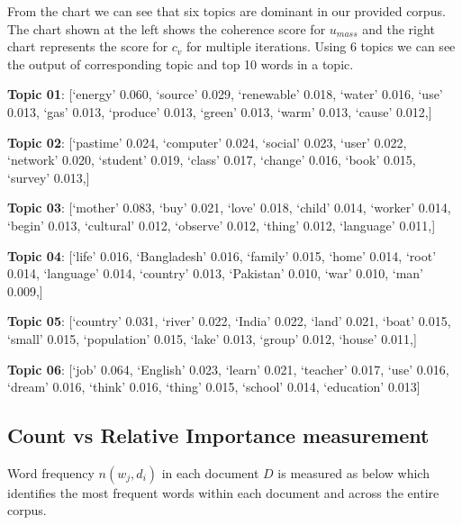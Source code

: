 \documentclass[sn-mathphys,Numbered]{sn-jnl}%
\theoremstyle{thmstyleone}%
\theoremstyle{thmstyletwo}%
\theoremstyle{thmstylethree}%
\begin{document}
From the chart we can see that six topics are dominant in our provided
corpus. The chart shown at the left shows the coherence score for
\(u_{mass}\) and the right chart represents the score for \(c_{v}\) for
multiple iterations. Using 6 topics we can see the output of
corresponding topic and top 10 words in a topic.



\textbf{Topic 01}: {[}\enquote*{energy} 0.060, \enquote*{source} 0.029, \enquote*{renewable} 0.018, \enquote*{water}
0.016, \enquote*{use} 0.013, \enquote*{gas} 0.013, \enquote*{produce} 0.013, \enquote*{green} 0.013, \enquote*{warm}
0.013, \enquote*{cause} 0.012,{]}

\textbf{Topic 02}: {[}\enquote*{pastime} 0.024, \enquote*{computer} 0.024, \enquote*{social} 0.023, \enquote*{user}
0.022, \enquote*{network} 0.020, \enquote*{student} 0.019, \enquote*{class} 0.017, \enquote*{change} 0.016,
\enquote*{book} 0.015, \enquote*{survey} 0.013,{]}

\textbf{Topic 03}: {[}\enquote*{mother} 0.083, \enquote*{buy} 0.021, \enquote*{love} 0.018, \enquote*{child} 0.014,
\enquote*{worker} 0.014, \enquote*{begin} 0.013, \enquote*{cultural} 0.012, \enquote*{observe} 0.012,
\enquote*{thing} 0.012, \enquote*{language} 0.011,{]}

\textbf{Topic 04}: {[}\enquote*{life} 0.016, \enquote*{Bangladesh} 0.016, \enquote*{family} 0.015, \enquote*{home}
0.014, \enquote*{root} 0.014, \enquote*{language} 0.014, \enquote*{country} 0.013, \enquote*{Pakistan}
0.010, \enquote*{war} 0.010, \enquote*{man} 0.009,{]}

\textbf{Topic 05}: {[}\enquote*{country} 0.031, \enquote*{river} 0.022, \enquote*{India} 0.022, \enquote*{land} 0.021,
\enquote*{boat} 0.015, \enquote*{small} 0.015, \enquote*{population} 0.015, \enquote*{lake} 0.013, \enquote*{group}
0.012, \enquote*{house} 0.011,{]}

\textbf{Topic 06}: {[}\enquote*{job} 0.064, \enquote*{English} 0.023, \enquote*{learn} 0.021, \enquote*{teacher}
0.017, \enquote*{use} 0.016, \enquote*{dream} 0.016, \enquote*{think} 0.016, \enquote*{thing} 0.015,
\enquote*{school} 0.014, \enquote*{education} 0.013{]}

\subsection{Count vs Relative Importance measurement}

Word frequency $n(w_{j},d_{i})$ in each document \(D\) is measured as below which identifies the most frequent words within each document and across the entire corpus.
\end{document}
